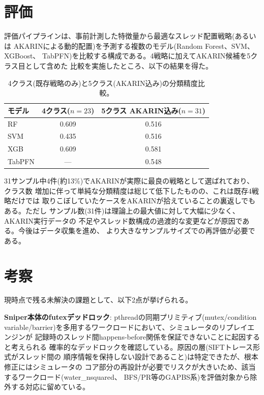 \documentclass[a4paper]{article}
\begin{document}
\section{評価}
評価パイプラインは、事前計測した特徴量から最適なスレッド配置戦略(あるいは
AKARINによる動的配置)を予測する複数のモデル(Random Forest、SVM、XGBoost、
TabPFN)を比較する構成である。4戦略に加えてAKARIN候補を5クラス目として含めた
比較を実施したところ、以下の結果を得た。

\begin{table}[h]
  \centering
  \small
  \begin{tabular}{lcc}
    \toprule
    モデル & 4クラス($n{=}23$) & 5クラス AKARIN込み($n{=}31$) \\
    \midrule
    RF     & 0.609 & 0.516 \\
    SVM    & 0.435 & 0.516 \\
    XGB    & 0.609 & 0.581 \\
    TabPFN & ---   & 0.548 \\
    \bottomrule
  \end{tabular}
  \caption{4クラス(既存戦略のみ)と5クラス(AKARIN込み)の分類精度比較。}
  \label{tab:akarin_comparison}
\end{table}

31サンプル中4件(約13\%)でAKARINが実際に最良の戦略として選ばれており、クラス数
増加に伴って単純な分類精度は総じて低下したものの、これは既存4戦略だけでは
取りこぼしていたケースをAKARINが拾えていることの裏返しでもある。ただし
サンプル数(31件)は理論上の最大値に対して大幅に少なく、AKARIN実行データの
不足やスレッド数構成の過渡的な変更などが原因である。今後はデータ収集を進め、
より大きなサンプルサイズでの再評価が必要である。

\section{考察}
現時点で残る未解決の課題として、以下2点が挙げられる。

\textbf{Sniper本体のfutexデッドロック}: pthreadの同期プリミティブ(mutex/condition
variable/barrier)を多用するワークロードにおいて、シミュレータのリプレイエンジンが
記録時のスレッド間happens-before関係を保証できないことに起因すると考えられる
確率的なデッドロックを確認している。原因の層(SIFTトレース形式がスレッド間の
順序情報を保持しない設計であること)は特定できたが、根本修正にはシミュレータの
コア部分の再設計が必要でリスクが大きいため、該当するワークロード(water\_nsquared、
BFS/PR等のGAPBS系)を評価対象から除外する対応に留めている。
\end{document}
